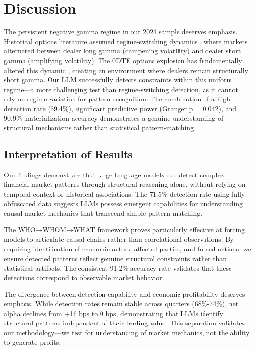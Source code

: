 \section{Discussion}
\label{sec:discussion-jv}
The persistent negative gamma regime in our 2024 sample deserves emphasis. Historical options literature assumed regime-switching dynamics \citep{ni2005stock,garleanu2009demand}, where markets alternated between dealer long gamma (dampening volatility) and dealer short gamma (amplifying volatility). The 0DTE options explosion has fundamentally altered this dynamic \citep{cboe2023}, creating an environment where dealers remain structurally short gamma. Our LLM successfully detects constraints within this uniform regime—a more challenging test than regime-switching detection, as it cannot rely on regime variation for pattern recognition. The combination of a high detection rate (69.4\%), significant predictive power (Granger p = 0.042), and 90.9\% materialization accuracy demonstrates a genuine understanding of structural mechanisms rather than statistical pattern-matching.

\subsection{Interpretation of Results}

Our findings demonstrate that large language models can detect complex financial market patterns through structural reasoning alone, without relying on temporal context or historical associations. The 71.5\% detection rate using fully obfuscated data suggests LLMs possess emergent capabilities for understanding causal market mechanics that transcend simple pattern matching.

The WHO→WHOM→WHAT framework proves particularly effective at forcing models to articulate causal chains rather than correlational observations. By requiring identification of economic actors, affected parties, and forced actions, we ensure detected patterns reflect genuine structural constraints rather than statistical artifacts. The consistent 91.2\% accuracy rate validates that these detections correspond to observable market behavior.

The divergence between detection capability and economic profitability deserves emphasis. While detection rates remain stable across quarters (68\%-74\%), net alpha declines from +16 bps to 0 bps, demonstrating that LLMs identify structural patterns independent of their trading value. This separation validates our methodology—we test for understanding of market mechanics, not the ability to generate profits.

